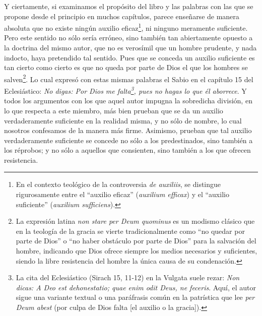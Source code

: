 \documentclass{article}
\begin{document}
Y ciertamente, si examinamos el propósito del libro y las palabras con las que se
propone desde el principio en muchos capítulos, parece enseñarse de manera absoluta que
no existe ningún auxilio eficaz\footnote{En el contexto teológico de la controversia
\textit{de auxiliis}, se distingue rigurosamente entre el \enquote{auxilio eficaz}
(\textit{auxilium efficax}) y el \enquote{auxilio suficiente} (\textit{auxilium
sufficiens}).}, ni ninguno meramente suficiente. Pero este sentido no sólo sería
erróneo, sino también tan abiertamente opuesto a la doctrina del mismo autor, que no es
verosímil que un hombre prudente, y nada indocto, haya pretendido tal sentido. Pues que
se conceda un auxilio suficiente es tan cierto como cierto es que no queda por parte de
Dios el que los hombres se salven\footnote{La expresión latina \textit{non stare per
Deum quominus} es un modismo clásico que en la teología de la gracia se vierte
tradicionalmente como \enquote{no quedar por parte de Dios} o \enquote{no haber
obstáculo por parte de Dios} para la salvación del hombre, indicando que Dios ofrece
siempre los medios necesarios y suficientes, siendo la libre resistencia del hombre la
única causa de su condenación.}. Lo cual expresó con estas mismas palabras el Sabio en
el capítulo 15 del Eclesiástico: \textit{No digas: Por Dios me falta\footnote{La cita
del Eclesiástico (Sirach 15, 11-12) en la Vulgata suele rezar: \textit{Non dicas: A Deo
est dehonestatio; quae enim odit Deus, ne feceris}. Aquí, el autor sigue una variante
textual o una paráfrasis común en la patrística que lee \textit{per Deum abest} (por
culpa de Dios falta [el auxilio o la gracia]).}, pues no hagas lo que él aborrece}.
Y todos los argumentos con los que aquel autor impugna la sobredicha división, en lo que
respecta a este miembro, más bien prueban que se da un auxilio verdaderamente suficiente
en la realidad misma, y no sólo de nombre, lo cual nosotros confesamos de la manera más
firme. Asimismo, prueban que tal auxilio verdaderamente suficiente se concede no sólo a
los predestinados, sino también a los réprobos; y no sólo a aquellos que consienten,
sino también a los que ofrecen resistencia.
\end{document}
